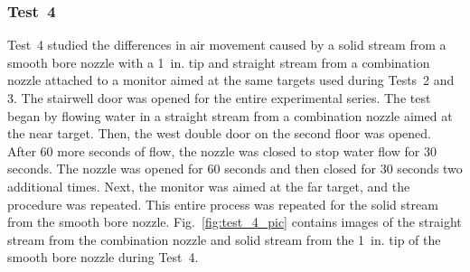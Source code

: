 \documentclass[12pt,oneside]{book}
\begin{document}
\subsubsection{Test~4}
Test~4 studied the differences in air movement caused by a solid stream from a smooth bore nozzle with a 1~in. tip and straight stream from a combination nozzle attached to a monitor aimed at the same targets used during Tests~2 and 3. The stairwell door was opened for the entire experimental series. The test began by flowing water in a straight stream from a combination nozzle aimed at the near target. Then, the west double door on the second floor was opened. After 60 more seconds of flow, the nozzle was closed to stop water flow for 30 seconds. The nozzle was opened for 60 seconds and then closed for 30 seconds two additional times. Next, the monitor was aimed at the far target, and the procedure was repeated. This entire process was repeated for the solid stream from the smooth bore nozzle. Fig.~\ref{fig:test_4_pic} contains images of the straight stream from the combination nozzle and solid stream from the 1~in. tip of the smooth bore nozzle during Test~4.
\end{document}
